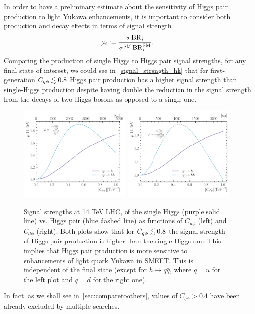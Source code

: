 \par In order to have a preliminary estimate about the sensitivity of Higgs pair production to light Yukawa enhancements, it is important to consider both production and decay effects in terms of signal strength
\begin{equation}
	\mu_i : = \frac{\sigma \, {\rm BR}_i } {\sigma^{\mathrm{SM}} \, {\rm BR}_i^{\mathrm{SM}}}.
\end{equation}
Comparing the production of single Higgs to Higgs pair signal strengths, for any final state of interest, we could see in~\autoref{signal_strength_hh} that for first-generation $C_{q \phi} \lesssim 0.8$ Higgs pair production has a higher signal strength than single-Higgs production despite having double the reduction in the signal strength from the decays of two Higgs bosons as opposed to a single one. 
\begin{figure}[!t]
	\centering
	\includegraphics[width = 0.49\textwidth]{./figures/up-signal-strength.pdf}
	\includegraphics[width = 0.49\textwidth]{./figures/dn-signal-strength}
	\caption{Signal strengths at 14 TeV LHC, of the single Higgs (purple solid line) vs. Higgs pair (blue dashed line) as functions of $C_{u\phi}$ (left) and $C_{d \phi}$ (right). Both plots show that for $C_{q \phi} \lesssim 0.8$  the signal strength of Higgs pair production is higher than the single Higgs one. This implies that Higgs pair production is more sensitive to enhancements of light quark Yukawa in SMEFT. This is independent of the final state (except for $ h \to q \bar q$, where $q=u$ for the left plot and $q=d$ for the right one).  }
	\label{signal_strength_hh}
\end{figure}
In fact, as we shall see in~\autoref{sec:comparetoothers}, values of $C_{q \phi} >0.4$ have been already excluded by multiple searches. 
